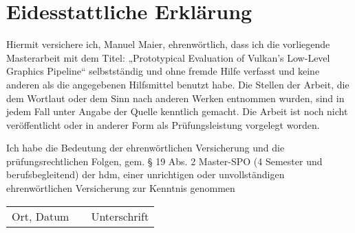 
\chapter*{Eidesstattliche Erklärung}

Hiermit versichere ich, Manuel Maier, ehrenwörtlich, dass ich die vorliegende Masterarbeit mit dem Titel: „Prototypical Evaluation of Vulkan's Low-Level Graphics Pipeline“ selbstständig und ohne fremde Hilfe verfasst und keine anderen als die angegebenen Hilfsmittel benutzt habe.
Die Stellen der Arbeit, die dem Wortlaut oder dem Sinn nach anderen Werken entnommen wurden, sind in jedem Fall unter Angabe der Quelle kenntlich gemacht.
Die Arbeit ist noch nicht veröffentlicht oder in anderer Form als Prüfungsleistung vorgelegt worden.

Ich habe die Bedeutung der ehrenwörtlichen Versicherung und die prüfungsrechtlichen Folgen, gem. § 19 Abs. 2 Master-SPO (4 Semester und berufsbegleitend) der \acrshort{hdm}, einer unrichtigen oder unvollständigen ehrenwörtlichen Versicherung zur Kenntnis genommen

\vspace{\fill}

\begin{tabu} to \linewidth { X[3] X X[3] }
  \hhline{-~-}
  {\small Ort, Datum} & & {\small Unterschrift}
\end{tabu}
